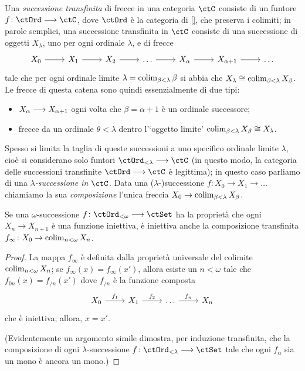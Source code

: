 \begin{definition}
 Una \emph{successione transfinita} di frecce in una categoria \(\ctC\) consiste di un funtore \(f \colon \ctOrd \fun \ctC\), dove \(\ctOrd\) è la categoria di \ref{}, che preserva i colimiti; in parole semplici, una successione transfinita in \(\ctC\) consiste di una successione di oggetti \(X_\lambda\), uno per ogni ordinale \(\lambda\), e di frecce
 \[
  \begin{tikzcd}
   X_0 \ar[r] & X_1\ar[r] & X_2 \ar[r]& \dots \ar[r] & X_\alpha \ar[r] & X_{\alpha+1}\ar[r] & \dots
  \end{tikzcd}
 \]
 tale che per ogni ordinale limite \(\lambda = \operatorname*{colim}_{\beta<\lambda}\beta\) si abbia che \(X_\lambda\cong \operatorname*{colim}_{\beta < \lambda} X_\beta\). Le frecce di questa catena sono quindi essenzialmente di due tipi:
 \begin{itemize}
  \item \(X_\alpha \longrightarrow X_{\alpha+1}\) ogni volta che \(\beta=\alpha+1\) è un ordinale successore;
  \item frecce da un ordinale \(\theta<\lambda\) dentro l'`oggetto limite' \(\operatorname*{colim}_{\beta<\lambda}X_\beta\cong X_\lambda\).
 \end{itemize}
 Spesso si limita la taglia di queste successioni a uno specifico ordinale limite \(\lambda\), cioè si considerano solo funtori \(\ctOrd_{<\lambda}\fun\ctC\) (in questo modo, la categoria delle successioni transfinite \(\ctOrd \fun \ctC\) è legittima); in questo caso parliamo di una \emph{\(\lambda\)-successione in \(\ctC\)}. Data una (\(\lambda\)-)successione \(f \colon X_0\to X_1 \to \dots\) chiamiamo la sua \emph{composizione} l'unica freccia \(X_0\to \operatorname*{colim}_{\beta<\lambda} X_\beta\).
\end{definition}
\begin{proposition}
 Se una \(\omega\)-successione \(f \colon \ctOrd_{<\omega}\fun\ctSet\) ha la proprietà che ogni \(X_n \to X_{n+1}\) è una funzione iniettiva, è iniettiva anche la composizione transfinita \(f_\infty \colon X_0\to \operatorname*{colim}_{n<\omega} X_n\).
\end{proposition}
\begin{proof}
 La mappa \(f_\infty\) è definita dalla proprietà universale del colimite \(\operatorname*{colim}_{n<\omega} X_n\); se \(f_\infty(x)=f_\infty(x')\), allora esiste un \(n<\omega\) tale che \(f_{0n}(x) = f_{/n}(x')\) dove \(f_{/n}\) è la funzione composta
 \[\begin{tikzcd}
   X_0 \ar[r, "f_1"]& X_1\ar[r, "f_2"] & \dots \ar[r, "f_n"] & X_n
  \end{tikzcd}\]
 che è iniettiva; allora, \(x=x'\).

 (Evidentemente un argomento simile dimostra, per induzione transfinita, che la composizione di ogni \(\lambda\)-successione \(f \colon \ctOrd_{<\lambda}\fun\ctSet\) tale che ogni \(f_\alpha\) sia un mono è ancora un mono.)
\end{proof}
